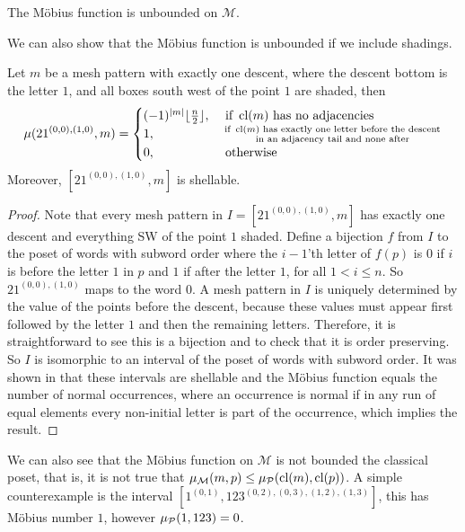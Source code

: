 \documentclass[11pt,a4paper,oneside]{article}
\begin{document}
\begin{cor}
The M\"obius function is unbounded on $\mathcal{M}$.
\end{cor}

We can also show that the M\"obius function is unbounded if we include shadings.

\begin{lem}\label{lem:mobUn}
Let $m$ be a mesh pattern with exactly one descent, where the descent bottom is
the letter $1$, and all boxes south west of the point $1$ are shaded, then
$$\mu(21^{(0,0),(1,0)},m)=\begin{cases}
(-1)^{|m|}\lfloor\frac{n}{2}\rfloor,&\mbox{ if } \operatorname{\textrm{cl}}(m) \mbox{ has no adjacencies}\\
1,&\substack{ \text{ if } \operatorname{\textrm{cl}}(m) \text{ has exactly one letter before the descent} \\\text{ in an adjacency tail and none after}}\\
0, &\mbox{ otherwise}
\end{cases}$$
Moreover, $[21^{(0,0),(1,0)},m]$ is shellable.
\begin{proof}
Note that every mesh pattern in $I=[21^{(0,0),(1,0)},m]$ has exactly one descent
and everything SW of the point $1$ shaded. Define a bijection $f$ from $I$ to
the poset of words with subword order where the $i-1$'th letter of $f(p)$ is $0$
if $i$ is before the letter $1$ in $p$ and $1$ if after the letter $1$, for all
$1<i\le n$. So $21^{(0,0),(1,0)}$ maps to the word $0$. A mesh pattern in $I$ is
uniquely determined by the value of the points before the descent, because these
values must appear first followed by the letter $1$ and then the remaining
letters. Therefore, it is straightforward to see this is a bijection and to
check that it is order preserving. So $I$ is isomorphic to an interval of the
poset of words with subword order. It was shown in \cite{Bjo90} that these
intervals are shellable and the M\"obius function equals the number of normal
occurrences, where an occurrence is normal if in any run of equal elements every
non-initial letter is part of the occurrence, which implies the result.
\end{proof}
\end{lem}

We can also see that the M\"obius function on $\mathcal{M}$ is not bounded the
classical poset, that is, it is not true that $\operatorname{\mu_\mathcal{M}}(m,p)\le
\operatorname{\mu_\mathcal{P}}(\operatorname{\textrm{cl}}(m),\operatorname{\textrm{cl}}(p))$. A simple counterexample is the interval
$[1^{(0,1)},123^{(0,2),(0,3),(1,2),(1,3)}]$, this has M\"obius number $1$,
however $\operatorname{\mu_\mathcal{P}}(1,123)=0$.
\end{document}
